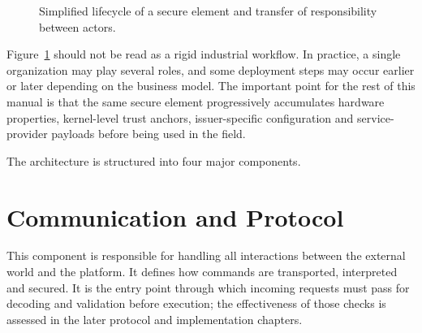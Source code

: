 \begin{figure}[ht]
  \caption{Simplified lifecycle of a secure element and transfer of responsibility between actors.}
  \label{fig:se-lifecycle-actors}
\end{figure}

Figure~\ref{fig:se-lifecycle-actors} should not be read as a rigid industrial
workflow. In practice, a single organization may play several roles, and some
deployment steps may occur earlier or later depending on the business model.
The important point for the rest of this manual is that the same secure element
progressively accumulates hardware properties, kernel-level trust anchors,
issuer-specific configuration and service-provider payloads before being used
in the field.

The architecture is structured into four major components.

\section{Communication and Protocol}

This component is responsible for handling all interactions between the
external world and the platform. It defines how commands are transported,
interpreted and secured. It is the entry point through which incoming requests
must pass for decoding and validation before execution;
the effectiveness of those checks is assessed in the later protocol and
implementation chapters.

